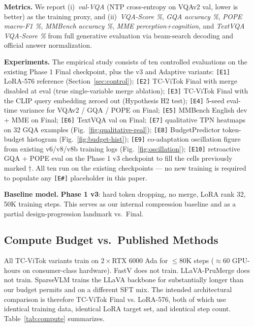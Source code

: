 \documentclass{article}
\begin{document}
\textbf{Metrics.}
We report (i)~\emph{val-VQA} (NTP cross-entropy on VQAv2 val, lower is better) as the
training proxy, and (ii)~\emph{VQA-Score \%}, \emph{GQA accuracy \%},
\emph{POPE macro-F1 \%}, \emph{MMBench accuracy \%}, \emph{MME perception+cognition},
and \emph{TextVQA VQA-Score \%} from full generative evaluation via beam-search
decoding and official answer normalization.

\textbf{Experiments.}
The empirical study consists of ten controlled evaluations on the existing
Phase 1 Final checkpoint, plus the v3 and Adaptive variants:
\texttt{[E1]} LoRA-576 reference (Section~\ref{sec:control});
\texttt{[E2]} TC-ViTok Final with merge disabled at eval (true single-variable
merge ablation);
\texttt{[E3]} TC-ViTok Final with the CLIP query embedding zeroed out
(Hypothesis H2 test);
\texttt{[E4]} 5-seed eval-time variance for VQAv2 / GQA / POPE on Final;
\texttt{[E5]} MMBench English dev + MME on Final;
\texttt{[E6]} TextVQA val on Final;
\texttt{[E7]} qualitative TPN heatmaps on 32 GQA examples (Fig.~\ref{fig:qualitative-real});
\texttt{[E8]} BudgetPredictor token-budget histogram (Fig.~\ref{fig:budget-hist});
\texttt{[E9]} co-adaptation oscillation figure from existing v6/v8/v8b training
logs (Fig.~\ref{fig:oscillation});
\texttt{[E10]} retroactive GQA + POPE eval on the Phase 1 v3 checkpoint to
fill the cells previously marked $\dagger$.
All ten run on the existing checkpoints --- no new training is required to
populate any \texttt{[E\#]} placeholder in this paper.

\textbf{Baseline model.}
\textbf{Phase 1 v3}: hard token dropping, no merge, LoRA rank 32, 50K training steps.
This serves as our internal compression baseline and as a partial design-progression
landmark vs.\ Final.

\subsection{Compute Budget vs.\ Published Methods}
\label{sec:compute}

All TC-ViTok variants train on $2{\times}$RTX 6000 Ada for $\le$80K steps
($\approx$60 GPU-hours on consumer-class hardware). FastV does not train.
LLaVA-PruMerge does not train. SparseVLM trains the LLaVA backbone for
substantially longer than our budget permits and on a different SFT mix. The
intended architectural comparison is therefore TC-ViTok Final vs.
LoRA-576, both of which use identical training data, identical LoRA target
set, and identical step count. Table~\ref{tab:compute} summarizes.
\end{document}

